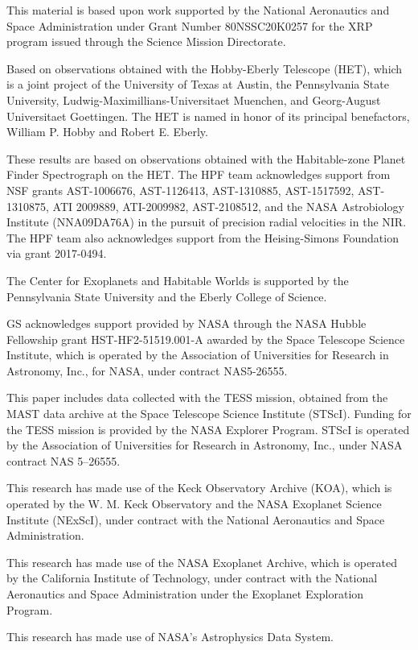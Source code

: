 \documentclass[twocolumn]{aastex631}
\begin{document}
\begin{acknowledgements}

    This material is based upon work supported by the National Aeronautics and Space Administration under Grant Number 80NSSC20K0257 for the XRP program issued through the Science Mission Directorate.

    Based on observations obtained with the Hobby-Eberly Telescope (HET), which is a joint project of the University of Texas at Austin, the Pennsylvania State University, Ludwig-Maximillians-Universitaet Muenchen, and Georg-August Universitaet Goettingen. The HET is named in honor of its principal benefactors, William P. Hobby and Robert E. Eberly.

    These results are based on observations obtained with the Habitable-zone Planet Finder Spectrograph on the HET. The HPF team acknowledges support from NSF grants AST-1006676, AST-1126413, AST-1310885, AST-1517592, AST-1310875, ATI 2009889, ATI-2009982, AST-2108512, and the NASA Astrobiology Institute (NNA09DA76A) in the pursuit of precision radial velocities in the NIR. The HPF team also acknowledges support from the Heising-Simons Foundation via grant 2017-0494.

    The Center for Exoplanets and Habitable Worlds is supported by the Pennsylvania State University and the Eberly College of Science.

    GS acknowledges support provided by NASA through the NASA Hubble Fellowship grant HST-HF2-51519.001-A awarded by the Space Telescope Science Institute, which is operated by the Association of Universities for Research in Astronomy, Inc., for NASA, under contract NAS5-26555.

    This paper includes data collected with the TESS mission, obtained from the MAST data archive at the Space Telescope Science Institute (STScI). Funding for the TESS mission is provided by the NASA Explorer Program. STScI is operated by the Association of Universities for Research in Astronomy, Inc., under NASA contract NAS 5–26555.

    This research has made use of the Keck Observatory Archive (KOA), which is operated by the W. M. Keck Observatory and the NASA Exoplanet Science Institute (NExScI), under contract with the National Aeronautics and Space Administration.

    This research has made use of the NASA Exoplanet Archive, which is operated by the California Institute of Technology, under contract with the National Aeronautics and Space Administration under the Exoplanet Exploration Program.

    This research has made use of NASA's Astrophysics Data System.
\end{acknowledgements}
\end{document}
